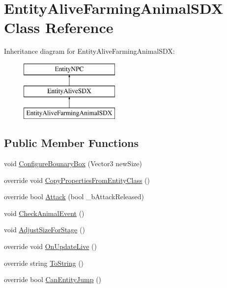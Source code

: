 \hypertarget{class_entity_alive_farming_animal_s_d_x}{}\section{Entity\+Alive\+Farming\+Animal\+S\+DX Class Reference}
\label{class_entity_alive_farming_animal_s_d_x}
Inheritance diagram for Entity\+Alive\+Farming\+Animal\+S\+DX\+:\begin{figure}[H]
\begin{center}
\leavevmode
\includegraphics[height=3.000000cm]{d4/de6/class_entity_alive_farming_animal_s_d_x}
\end{center}
\end{figure}
\subsection*{Public Member Functions}
\begin{DoxyCompactItemize}
\item 
void \mbox{\hyperlink{class_entity_alive_farming_animal_s_d_x_ab21718ff9ea7c49151c75dc1860be3ef}{Configure\+Bounary\+Box}} (Vector3 new\+Size)
\item 
override void \mbox{\hyperlink{class_entity_alive_farming_animal_s_d_x_a38ff8d31b3da26b1a179b4427610f880}{Copy\+Properties\+From\+Entity\+Class}} ()
\item 
override bool \mbox{\hyperlink{class_entity_alive_farming_animal_s_d_x_af1bff3e18731ed19c9435023f104c782}{Attack}} (bool \+\_\+b\+Attack\+Released)
\item 
void \mbox{\hyperlink{class_entity_alive_farming_animal_s_d_x_a13aff46204687873f3d4637585612d6e}{Check\+Animal\+Event}} ()
\item 
void \mbox{\hyperlink{class_entity_alive_farming_animal_s_d_x_a260d6bbf1a7d21fcf274e899b6347e44}{Adjust\+Size\+For\+Stage}} ()
\item 
override void \mbox{\hyperlink{class_entity_alive_farming_animal_s_d_x_a7beb1631a7f2d5b3e5a9967a4a2fcc55}{On\+Update\+Live}} ()
\item 
override string \mbox{\hyperlink{class_entity_alive_farming_animal_s_d_x_a0c73747ffe4df09009bd0b91c6262dab}{To\+String}} ()
\item 
override bool \mbox{\hyperlink{class_entity_alive_farming_animal_s_d_x_a30b47d85e719e776aae7f150e5dfe6c5}{Can\+Entity\+Jump}} ()
\end{DoxyCompactItemize}

